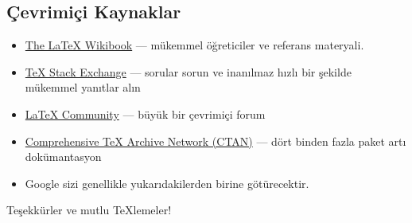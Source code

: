 \documentclass[aspectratio=169]{beamer}
\begin{document}
\subsection{Çevrimiçi Kaynaklar}
\begin{frame}{\insertsubsection}
\begin{itemize}
\item \href{http://en.wikibooks.org/wiki/LaTeX}{The \LaTeX{} Wikibook} ---
mükemmel öğreticiler ve referans materyali.
\item \href{http://tex.stackexchange.com/}{\TeX{} Stack Exchange} --- sorular sorun ve inanılmaz hızlı bir şekilde mükemmel yanıtlar alın
\item \href{http://www.latex-community.org/}{\LaTeX{} Community} --- büyük bir çevrimiçi forum
\item \href{http://ctan.org/}{Comprehensive \TeX{} Archive Network (CTAN)} ---
dört binden fazla paket artı dokümantasyon
\item Google sizi genellikle yukarıdakilerden birine götürecektir.
\end{itemize}
\end{frame}

\begin{frame}
\begin{center}
Teşekkürler ve mutlu \TeX{}lemeler!
\end{center}
\end{frame}
\end{document}
